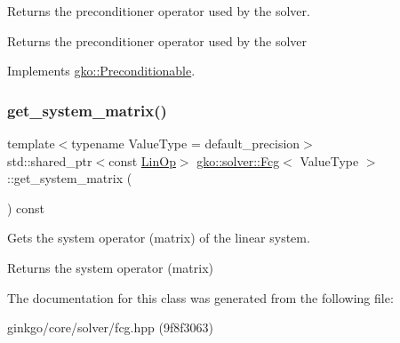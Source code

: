 Returns the preconditioner operator used by the solver. 

\begin{DoxyReturn}{Returns}
the preconditioner operator used by the solver 
\end{DoxyReturn}


Implements \hyperlink{classgko_1_1Preconditionable_ad9545089aef0dfc83bc7a74e5bf1d748}{gko\+::\+Preconditionable}.

\mbox{\label{classgko_1_1solver_1_1Fcg_aae8c67d27df239c18750845275605c87}} 
\subsubsection{\texorpdfstring{get\+\_\+system\+\_\+matrix()}{get\_system\_matrix()}}
{\footnotesize\ttfamily template$<$typename Value\+Type  = default\+\_\+precision$>$ \\
std\+::shared\+\_\+ptr$<$const \hyperlink{classgko_1_1LinOp}{Lin\+Op}$>$ \hyperlink{classgko_1_1solver_1_1Fcg}{gko\+::solver\+::\+Fcg}$<$ Value\+Type $>$\+::get\+\_\+system\+\_\+matrix (\begin{DoxyParamCaption}{ }\end{DoxyParamCaption}) const}



Gets the system operator (matrix) of the linear system. 

\begin{DoxyReturn}{Returns}
the system operator (matrix) 
\end{DoxyReturn}


The documentation for this class was generated from the following file\+:\begin{DoxyCompactItemize}
\item 
ginkgo/core/solver/fcg.\+hpp (9f8f3063)\end{DoxyCompactItemize}
